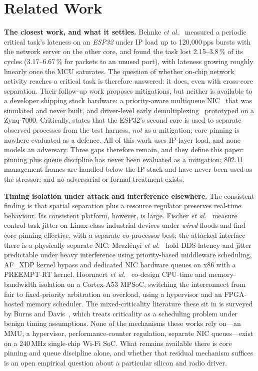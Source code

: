\section{Related Work}
\textbf{The closest work, and what it settles.} Behnke \emph{et al.}~\cite{behnke2020} measured
a periodic critical task's lateness on an \emph{ESP32} under IP load up to 120{,}000\,pps bursts
with the network server on the other core, and found the task lost 2.15--3.8\,\% of its cycles
(3.17--6.67\,\% for packets to an unused port), with lateness growing roughly linearly once the
MCU saturates. The question of whether on-chip network activity reaches a critical task is
therefore answered: it does, even with cross-core separation. Their follow-up work proposes
mitigations, but neither is available to a developer shipping stock hardware: a priority-aware
multiqueue NIC~\cite{behnke2022} that was simulated and never built, and driver-level early
demultiplexing~\cite{behnke2023} prototyped on a Zynq-7000. Critically, \cite{behnke2023} states
that the ESP32's second core is used to separate observed processes from the test harness,
\emph{not} as a mitigation; core pinning is nowhere evaluated as a defence. All of this work
uses IP-layer load, and none models an adversary. Three gaps therefore remain, and they define
this paper: pinning plus queue discipline has never been evaluated as a mitigation; 802.11
management frames are handled below the IP stack and have never been used as the stressor; and
no adversarial or formal treatment exists.

\textbf{Timing isolation under attack and interference elsewhere.} The
consistent finding is that spatial separation plus a resource regulator preserves real-time
behaviour. Its consistent platform, however, is large. Fischer \emph{et al.}~\cite{fischer2020}
measure control-task jitter on Linux-class industrial devices under \emph{wired} floods and find
core pinning effective, with a separate co-processor best; the attacked interface there is a
physically separate NIC. Meszl\'enyi \emph{et al.}~\cite{timingiso2025} hold DDS latency and jitter
predictable under heavy interference using priority-based middleware scheduling, AF\_XDP kernel
bypass and dedicated NIC hardware queues on x86 with a PREEMPT-RT kernel. Hoornaert
\emph{et al.}~\cite{mcti2024} co-design CPU-time and memory-bandwidth isolation on a Cortex-A53
MPSoC, switching the interconnect from fair to fixed-priority arbitration on overload, using a
hypervisor and an FPGA-hosted memory scheduler. The mixed-criticality literature these sit in is
surveyed by Burns and Davis~\cite{mcreview2026}, which treats criticality as a scheduling problem
under benign timing assumptions. None of the mechanisms these works rely on---an MMU, a
hypervisor, performance-counter regulation, separate NIC queues---exist on a 240\,MHz
single-chip Wi-Fi SoC. What remains available there is core pinning and queue discipline alone,
and whether that residual mechanism suffices is an open empirical question about a particular
silicon and radio driver.

